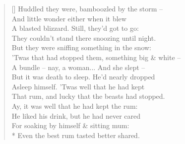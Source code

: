 \documentclass[MAIN]{subfiles}
\begin{document}
\begin{verse}[\versewidth]
Huddled they were, bamboozled by the storm --\\
And little wonder either when it blew\\
A blasted blizzard. Still, they'd got to go:\\
They couldn't stand there snoozing until night.\\
But they were sniffing something in the snow:\\
'Twas that had stopped them, something big \& white --\\
A bundle -- nay, a woman... And she slept --\\
But it was death to sleep. He'd nearly dropped\\
Asleep himself. 'Twas well that he had kept\\
That rum, and lucky that the beasts had stopped.\\
Ay, it was well that he had kept the rum:\\
He liked his drink, but he had never cared\\
For soaking by himself \& sitting mum:\\*
Even the best rum tasted better shared.
\end{verse}
\end{document}
